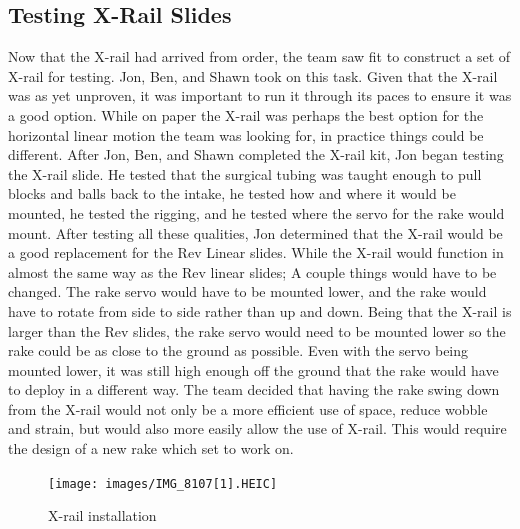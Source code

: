 \documentclass{article}
\begin{document}
\subsection{Testing X-Rail Slides}
Now that the X-rail had arrived from order, the team saw fit to construct a set of X-rail for testing. Jon, Ben, and Shawn took on this task. Given that the X-rail was as yet unproven, it was important to run it through its paces to ensure it was a good option. While on paper the X-rail was perhaps the best option for the horizontal linear motion the team was looking for, in practice things could be different. After Jon, Ben, and Shawn completed the X-rail kit, Jon began testing the X-rail slide. He tested that the surgical tubing was taught enough to pull blocks and balls back to the intake, he tested how and where it would be mounted, he tested the rigging, and he tested where the servo for the rake would mount. After testing all these qualities, Jon determined that the X-rail would be a good replacement for the Rev Linear slides. While the X-rail would function in almost the same way as the Rev linear slides; A couple things would have to be changed. The rake servo would have to be mounted lower, and the rake would have to rotate from side to side rather than up and down. Being that the X-rail is larger than the Rev slides, the rake servo would need to be mounted lower so the rake could be as close to the ground as possible. Even with the servo being mounted lower, it was still high enough off the ground that the rake would have to deploy in a different way. The team decided that having the rake swing down from the X-rail would not only be a more efficient use of space, reduce wobble and strain, but would also more easily allow the use of X-rail. This would require the design of a new rake which set to work on. 

\begin{figure}
    \centering
    \texttt{[image: images/IMG\_8107[1].HEIC]}
    \caption{X-rail installation}
    \label{fig:my_label}
\end{figure}
\end{document}
